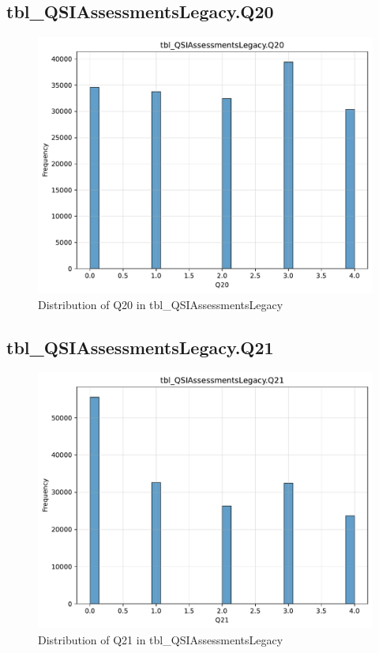 \subsection{tbl\_QSIAssessmentsLegacy.Q20}

\begin{figure}[htbp]
\centering
\includegraphics[width=\textwidth]{figures/dbo_tbl_QSIAssessmentsLegacy_Q20.pdf}
\caption{Distribution of Q20 in tbl\_QSIAssessmentsLegacy}
\end{figure}\newpage

\subsection{tbl\_QSIAssessmentsLegacy.Q21}

\begin{figure}[htbp]
\centering
\includegraphics[width=\textwidth]{figures/dbo_tbl_QSIAssessmentsLegacy_Q21.pdf}
\caption{Distribution of Q21 in tbl\_QSIAssessmentsLegacy}
\end{figure}\newpage

